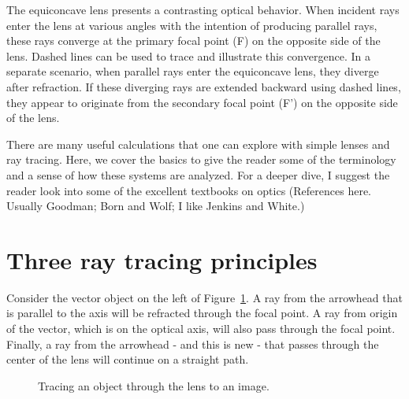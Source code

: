 \documentclass[
  letterpaper,
]{book}
\begin{document}
The equiconcave lens presents a contrasting optical behavior. When
incident rays enter the lens at various angles with the intention of
producing parallel rays, these rays converge at the primary focal point
(F) on the opposite side of the lens. Dashed lines can be used to trace
and illustrate this convergence. In a separate scenario, when parallel
rays enter the equiconcave lens, they diverge after refraction. If these
diverging rays are extended backward using dashed lines, they appear to
originate from the secondary focal point (F') on the opposite side of
the lens.

There are many useful calculations that one can explore with simple
lenses and ray tracing. Here, we cover the basics to give the reader
some of the terminology and a sense of how these systems are analyzed.
For a deeper dive, I suggest the reader look into some of the excellent
textbooks on optics (References here. Usually Goodman; Born and Wolf; I
like Jenkins and White.)

\section{Three ray tracing principles}\label{sec-optics-3principles}

Consider the vector object on the left of
Figure~\ref{fig-lensmaker-center}. A ray from the arrowhead that is
parallel to the axis will be refracted through the focal point. A ray
from origin of the vector, which is on the optical axis, will also pass
through the focal point. Finally, a ray from the arrowhead - and this is
new - that passes through the center of the lens will continue on a
straight path.

\begin{figure}


\caption{\label{fig-lensmaker-center}Tracing an object through the lens
to an image.}

\end{figure}%
\end{document}
